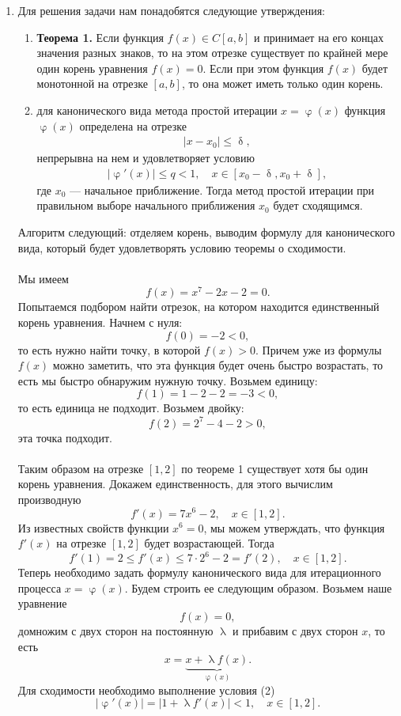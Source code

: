 \documentclass[a4paper, 12pt]{article}
\renewcommand{\leq}{\leqslant}
\renewcommand{\delta}{\updelta}
\renewcommand{\varphi}{\upvarphi}
\renewcommand{\lambda}{\uplambda}
\begin{document}
\begin{enumerate}
		\newpage
		\item 
		\hypertarget{t2}{}
		 Для решения задачи нам понадобятся следующие утверждения:
		 \begin{enumerate}
		 	\item \textbf{Теорема 1.} Если функция $f(x)\in C[a,b]$ и принимает на его концах значения разных знаков, то на этом отрезке существует по крайней мере один корень уравнения $f(x) = 0$.
		 	Если при этом функция $f(x)$ будет монотонной на отрезке $[a,b]$, то она может иметь только один корень.
		 	\item для канонического вида метода простой итерации $x = \varphi(x)$ функция $\varphi(x)$ определена на отрезке \begin{eqnarray}
		 		|x - x_0| \leq \delta,
		 	\end{eqnarray} непрерывна на нем и удовлетворяет условию \begin{eqnarray}
		 		|\varphi'(x)| \leq q < 1,\quad x \in [x_0-\delta, x_0 + \delta],
		 	\end{eqnarray}
		 	где $x_0$ --- начальное приближение.
		 	Тогда метод простой итерации при правильном выборе начального приближения $x_0$ будет сходящимся.
		 \end{enumerate}
		 Алгоритм следующий: отделяем корень, выводим формулу для канонического вида, который будет удовлетворять условию теоремы о сходимости.
		 \\\\
		 Мы имеем $$f(x) = x^7 -2x-2 = 0.$$
		 Попытаемся подбором найти отрезок, на котором находится единственный корень уравнения. Начнем с нуля:
		 $$f(0) = -2 < 0,$$
		 то есть нужно найти точку, в которой $f(x)>0$. Причем уже из формулы $f(x)$ можно заметить, что эта функция будет очень быстро возрастать, то есть мы быстро обнаружим нужную точку. Возьмем единицу:
		 $$f(1) = 1-2-2=-3 < 0,$$
		 то есть единица не подходит. Возьмем двойку:
		 $$f(2) = 2^7 - 4 - 2 > 0,$$
		 эта точка подходит.\\\\
		 Таким образом на отрезке $[1, 2]$ по теореме 1 существует хотя бы один корень уравнения. Докажем единственность, для этого вычислим производную $$f'(x) = 7x^6 - 2,\quad x \in [1,2].$$
		 Из известных свойств функции $x^6=0$, мы можем утверждать, что функция $f'(x)$ на отрезке $[1,2]$ будет возрастающей. Тогда $$f'(1) = 2 \leq f'(x) \leq 7\cdot 2^6 -2 = f'(2),\quad x \in [1,2].$$
		 Теперь необходимо задать формулу канонического вида для итерационного процесса $x = \varphi(x)$. Будем строить ее следующим образом. Возьмем наше уравнение $$f(x) = 0,$$ домножим с двух сторон на постоянную $\lambda$ и прибавим с двух сторон $x$, то есть $$x = \underbrace{x + \lambda f(x)}_{\varphi(x)}.$$ Для сходимости необходимо выполнение условия (2) $$|\varphi'(x)| = |1 + \lambda f'(x)| < 1,\quad x \in [1,2].$$

\end{enumerate}
\end{document}
